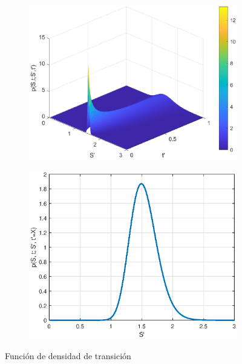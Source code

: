 \begin{figure}[H]
    \centering
    \begin{subfigure}[b]{0.45\linewidth}
        \includegraphics[width=\linewidth]{Imagenes/Parte1/3_Aleatoriedad/PDF_3D.eps}
    \end{subfigure}
        \begin{subfigure}[b]{0.45\linewidth}
        \includegraphics[width=\linewidth]{Imagenes/Parte1/3_Aleatoriedad/PDF_2D.eps}
    \end{subfigure}
    \caption{Función de densidad de transición}
\end{figure}



